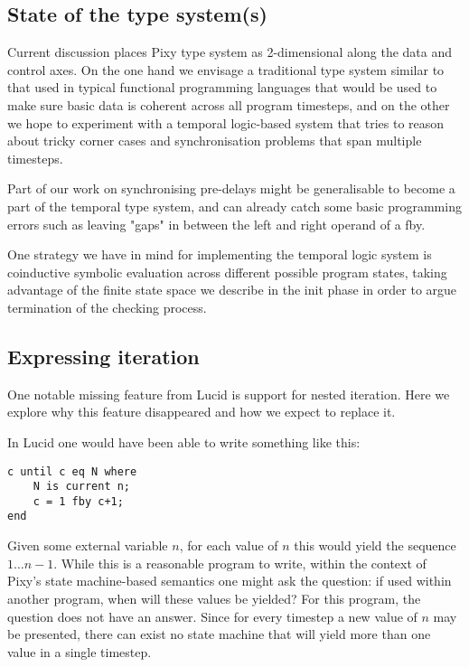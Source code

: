 \documentclass{scrartcl}
\begin{document}
    \subsection{State of the type system(s)}
    
    Current discussion places Pixy type system as 2-dimensional along the data and control axes. On the one hand we envisage a traditional type system similar to that used in typical functional programming languages that would be used to make sure basic data is coherent across all program timesteps, and on the other we hope to experiment with a temporal logic-based system that tries to reason about tricky corner cases and synchronisation problems that span multiple timesteps.
    
    Part of our work on synchronising pre-delays might be generalisable to become a part of the temporal type system, and can already catch some basic programming errors such as leaving "gaps" in between the left and right operand of a fby.
    
    One strategy we have in mind for implementing the temporal logic system is coinductive symbolic evaluation across different possible program states, taking advantage of the finite state space we describe in the init phase in order to argue termination of the checking process.
    
    \subsection{Expressing iteration}
    
    One notable missing feature from Lucid is support for nested iteration. Here we explore why this feature disappeared and how we expect to replace it.
    
    In Lucid one would have been able to write something like this:
    
    \begin{lstlisting}
c until c eq N where
    N is current n;
    c = 1 fby c+1;
end
    \end{lstlisting}
    
    Given some external variable $n$, for each value of $n$ this would yield the sequence $1 \dots n-1$. While this is a reasonable program to write, within the context of Pixy's state machine-based semantics one might ask the question: if used within another program, when will these values be yielded? For this program, the question does not have an answer. Since for every timestep a new value of $n$ may be presented, there can exist no state machine that will yield more than one value in a single timestep.
    
\end{document}
